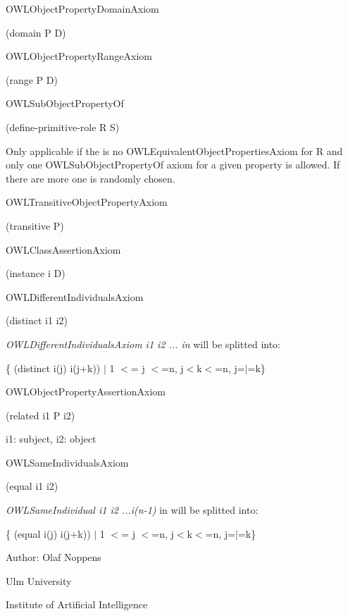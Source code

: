 O\-W\-L\-Object\-Property\-Domain\-Axiom 

(domain P D) 

O\-W\-L\-Object\-Property\-Range\-Axiom 

(range P D) 

O\-W\-L\-Sub\-Object\-Property\-Of 

(define-\/primitive-\/role R S) 

Only applicable if the is no O\-W\-L\-Equivalent\-Object\-Properties\-Axiom for R and only one O\-W\-L\-Sub\-Object\-Property\-Of axiom for a given property is allowed. If there are more one is randomly chosen.  

O\-W\-L\-Transitive\-Object\-Property\-Axiom 

(transitive P)   

O\-W\-L\-Class\-Assertion\-Axiom 

(instance i D)   

O\-W\-L\-Different\-Individuals\-Axiom 

(distinct i1 i2) 

{\itshape O\-W\-L\-Different\-Individuals\-Axiom i1 i2 ... in} will be splitted into\-:\par
 \{ (distinct i(j) i(j+k)) $|$ 1 $<$= j $<$=n, j$<$k$<$=n, j=$|$=k\} \par
   

O\-W\-L\-Object\-Property\-Assertion\-Axiom 

(related i1 P i2) 

i1\-: subject, i2\-: object  

O\-W\-L\-Same\-Individuals\-Axiom 

(equal i1 i2) 

{\itshape O\-W\-L\-Same\-Individual i1 i2 ...i(n-\/1)} in will be splitted into\-:\par
 \{ (equal i(j) i(j+k)) $|$ 1 $<$= j $<$=n, j$<$k$<$=n, j=$|$=k\} \par
   

Author\-: Olaf Noppens\par
 Ulm University\par
 Institute of Artificial Intelligence\par
 

